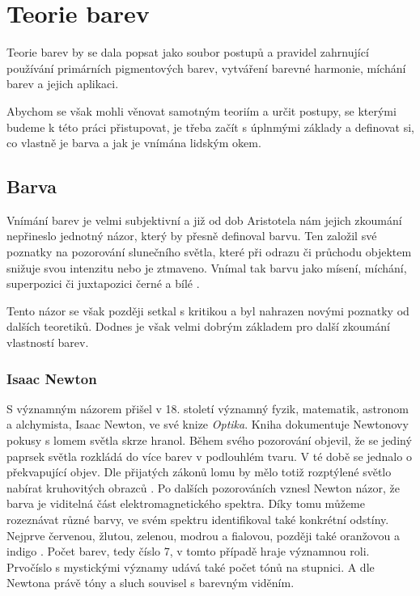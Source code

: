 \section{Teorie barev}
Teorie barev by se dala popsat jako soubor postupů a pravidel zahrnující 
používání primárních pigmentových barev, vytváření barevné harmonie, míchání barev
a jejich aplikaci.

Abychom se však mohli věnovat samotným teoriím a určit postupy, se kterými budeme k této práci
přistupovat, je třeba začít s úplnmými základy a definovat si, co vlastně je barva a jak je vnímána
lidským okem.


\subsection{Barva}
Vnímání barev je velmi subjektivní a již od dob Aristotela nám jejich zkoumání nepřineslo
jednotný názor, který by přesně definoval barvu.
Ten založil své poznatky na pozorování slunečního světla, které při odrazu či průchodu objektem
snižuje svou intenzitu nebo je ztmaveno. Vnímal tak barvu jako mísení, míchání, superpozici či juxtapozici
černé a bílé \cite{goethe1840}.

Tento názor se však později setkal s kritikou a byl nahrazen novými poznatky od dalších teoretiků. Dodnes je však
velmi dobrým základem pro další zkoumání vlastností barev.

\subsubsection{Isaac Newton}
S významným názorem přišel v 18. století významný fyzik, matematik, astronom a alchymista, Isaac Newton, ve své knize \emph{Optika}. Kniha dokumentuje Newtonovy pokusy s lomem světla
skrze hranol. Během svého pozorování objevil, že se jediný paprsek světla rozkládá do více barev v podlouhlém tvaru. V té době se jednalo o překvapující
objev. Dle přijatých zákonů lomu by mělo totiž rozptýlené světlo nabírat kruhovitých obrazců \cite{adams2013newton}. Po dalších pozorováních vznesl Newton názor, že barva je 
viditelná část elektromagnetického spektra. Díky tomu můžeme rozeznávat různé barvy, ve svém spektru
identifikoval také konkrétní odstíny. Nejprve červenou, žlutou, zelenou, modrou a fialovou, později také oranžovou a indigo \cite{science-color}.
Počet barev, tedy číslo 7, v tomto případě hraje významnou roli. Prvočíslo s mystickými významy udává také počet tónů na stupnici. A dle Newtona
právě tóny a sluch souvisel s barevným viděním. 

